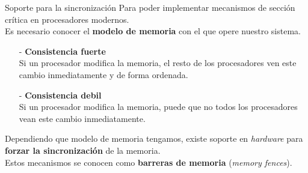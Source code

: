 \documentclass[aspectratio=169]{beamer}
\begin{document}
\begin{frame}{Soporte para la sincronización}
    \small
    Para poder implementar mecanismos de sección crítica en procesadores modernos.\\
    \medskip
    Es necesario conocer el \textbf{modelo de memoria} con el que opere nuestro sistema.\\
    \begin{itemize}
    \item[-] \textcolor{naranjauca}{\textbf{Consistencia fuerte}}\\
    Si un procesador modifica la memoria, el resto de los procesadores ven este cambio inmediatamente y de forma ordenada.
    \item[-] \textcolor{naranjauca}{\textbf{Consistencia debil}}\\
    Si un procesador modifica la memoria, puede que no todos los procesadores vean este cambio inmediatamente.
    \end{itemize}
    \medskip
    Dependiendo que modelo de memoria tengamos, existe soporte en \emph{hardware} para\\ \textbf{forzar la sincronización} de la memoria.\\
    \medskip
    Estos mecanismos se conocen como \textbf{barreras de memoria} (\emph{memory fences}).
\end{frame}
\end{document}
